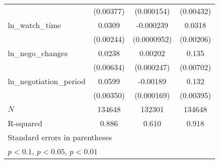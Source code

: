 {\begin{tabular}{l*{3}{c}}
            &   (0.00377)         &  (0.000154)         &   (0.00432)         \\
\addlinespace
ln\_watch\_time&      0.0309\sym{***}&   -0.000239\sym{**} &      0.0318\sym{***}\\
            &   (0.00244)         & (0.0000952)         &   (0.00206)         \\
\addlinespace
ln\_nego\_changes&      0.0238\sym{***}&     0.00202\sym{***}&       0.135\sym{***}\\
            &   (0.00634)         &  (0.000247)         &   (0.00702)         \\
\addlinespace
ln\_negotiation\_period&      0.0599\sym{***}&    -0.00189\sym{***}&       0.132\sym{***}\\
            &   (0.00350)         &  (0.000169)         &   (0.00395)         \\
\midrule
\(N\)       &      134648         &      132301         &      134648         \\
R-squared   &       0.886         &       0.610         &       0.918         \\
\bottomrule
\multicolumn{4}{l}{\footnotesize Standard errors in parentheses}\\
\multicolumn{4}{l}{\footnotesize \sym{*} \(p<0.1\), \sym{**} \(p<0.05\), \sym{***} \(p<0.01\)}\\
\end{tabular}
}
